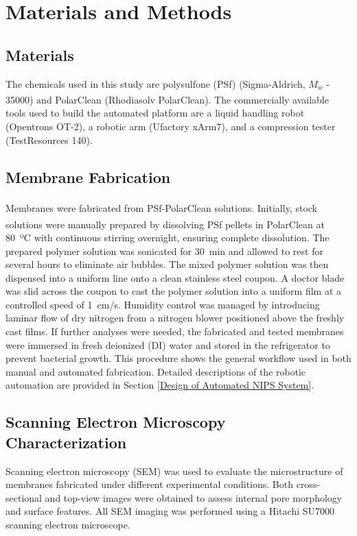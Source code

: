 \documentclass[preprint,12pt,times]{elsarticle}
\begin{document}
\section{Materials and Methods}
\label{sec2}

\subsection{Materials}
The chemicals used in this study are polysulfone (PSf) (Sigma-Aldrich, $M_w$ - 35000) and PolarClean\textsuperscript{\textregistered} (Rhodiasolv PolarClean\textsuperscript{\textregistered}). The commercially available tools used to build the automated platform are a liquid handling robot (Opentrons OT-2), a robotic arm (Ufactory xArm7), and a compression tester (TestResources 140). 

\subsection{Membrane Fabrication}
Membranes were fabricated from PSf-PolarClean\textsuperscript{\textregistered} solutions. Initially, stock solutions were manually prepared by dissolving PSf pellets in PolarClean\textsuperscript{\textregistered} at 80~ºC with continuous stirring overnight, ensuring complete dissolution. The prepared polymer solution was sonicated for 30~min and allowed to rest for several hours to eliminate air bubbles. The mixed polymer solution was then dispensed into a uniform line onto a clean stainless steel coupon. A doctor blade was slid across the coupon to cast the polymer solution into a uniform film at a controlled speed of 1~cm/s. Humidity control was managed by introducing laminar flow of dry nitrogen from a nitrogen blower positioned above the freshly cast films. If further analyses were needed, the fabricated and tested membranes were immersed in fresh deionized (DI) water and stored in the refrigerator to prevent bacterial growth. This procedure shows the general workflow used in both manual and automated fabrication. Detailed descriptions of the robotic automation are provided in Section \ref{Design of Automated NIPS System}.


\subsection{Scanning Electron Microscopy Characterization}
Scanning electron microscopy (SEM) was used to evaluate the microstructure of membranes fabricated under different experimental conditions. Both cross-sectional and top-view images were obtained to assess internal pore morphology and surface features. All SEM imaging was performed using a Hitachi SU7000 scanning electron microscope.
\end{document}
